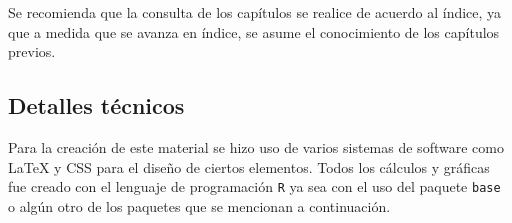 \documentclass[
  a4paper,
  oneside,
  openany]{book}
\begin{document}
Se recomienda que la consulta de los capítulos se realice de acuerdo al índice, ya que a medida que se avanza en índice, se asume el conocimiento de los capítulos previos.

\hypertarget{detalles-tuxe9cnicos}{%
\subsection*{Detalles técnicos}\label{detalles-tuxe9cnicos}}


Para la creación de este material se hizo uso de varios sistemas de software como LaTeX y CSS para el diseño de ciertos elementos. Todos los cálculos y gráficas fue creado con el lenguaje de programación \texttt{R} ya sea con el uso del paquete \texttt{base} o algún otro de los paquetes que se mencionan a continuación.
\end{document}
